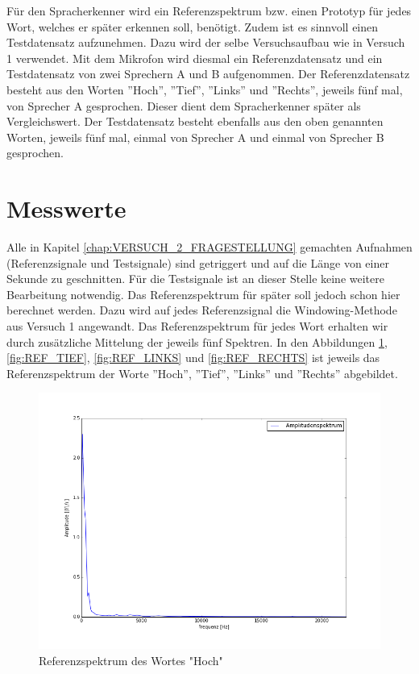 \documentclass[12pt,oneside,a4paper]{report}
\begin{document}
Für den Spracherkenner wird ein Referenzspektrum bzw. einen Prototyp für jedes Wort, welches er später erkennen soll, benötigt. Zudem ist es sinnvoll einen Testdatensatz aufzunehmen.
Dazu wird der selbe Versuchsaufbau wie in Versuch 1 verwendet.
Mit dem Mikrofon wird diesmal ein Referenzdatensatz und ein Testdatensatz von zwei Sprechern A und B aufgenommen.
Der Referenzdatensatz besteht aus den Worten ''Hoch'', ''Tief'', ''Links'' und ''Rechts'', jeweils fünf mal, von Sprecher A gesprochen. Dieser dient dem Spracherkenner später als Vergleichswert. Der Testdatensatz besteht ebenfalls aus den oben genannten Worten, jeweils fünf mal, einmal von Sprecher A und einmal von Sprecher B gesprochen.

\section{Messwerte}
\label{chap:VERSUCH_2_MESSWERTE}

Alle in Kapitel \ref{chap:VERSUCH_2_FRAGESTELLUNG} gemachten Aufnahmen (Referenzsignale und Testsignale) sind getriggert und auf die Länge von einer Sekunde zu geschnitten.
Für die Testsignale ist an dieser Stelle keine weitere Bearbeitung notwendig.
Das Referenzspektrum für später soll jedoch schon hier berechnet werden.
Dazu wird auf jedes Referenzsignal die Windowing-Methode aus Versuch 1 angewandt.
Das Referenzspektrum für jedes Wort erhalten wir durch zusätzliche Mittelung der jeweils fünf Spektren.
In den Abbildungen \ref{fig:REF_HOCH}, \ref{fig:REF_TIEF}, \ref{fig:REF_LINKS} und  \ref{fig:REF_RECHTS} ist jeweils das Referenzspektrum der Worte ''Hoch'', ''Tief'', ''Links'' und ''Rechts'' abgebildet.

\begin{figure}[H]
\centering\small
\includegraphics[scale=0.5]{src/ReferenzspektrumHoch.png}
\caption{Referenzspektrum des Wortes "Hoch"}
\label{fig:REF_HOCH}
\end{figure}
\end{document}
